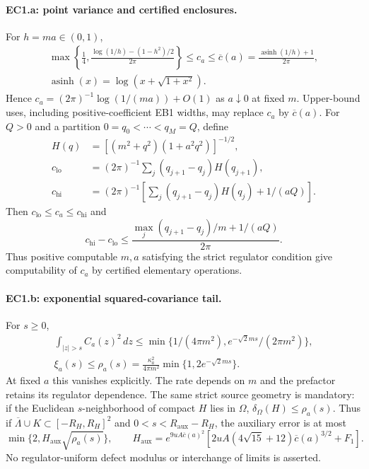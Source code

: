 \documentclass[11pt]{article}
\theoremstyle{plain}
\theoremstyle{definition}
\theoremstyle{remark}
\begin{document}
\paragraph{EC1.a: point variance and certified enclosures.}
For $h=ma\in(0,1)$,
\begin{gather*}
 \max\left\{\frac14,\frac{\log(1/h)-(1-h^2)/2}{2\pi}\right\}
 \le c_a\le\overline c(a)=\frac{\operatorname{asinh}(1/h)+1}{2\pi},\\
 \operatorname{asinh}(x)=\log(x+\sqrt{1+x^2}).
\end{gather*}
Hence $c_a=(2\pi)^{-1}\log(1/(ma))+O(1)$ as $a\downarrow0$ at fixed
$m$. Upper-bound uses, including positive-coefficient EB1 widths, may
replace $c_a$ by $\overline c(a)$. For $Q>0$ and a partition
$0=q_0<\cdots<q_M=Q$, define
\begin{align*}
 H(q)&=[(m^2+q^2)(1+a^2q^2)]^{-1/2},\\
 c_{\mathrm{lo}}&=(2\pi)^{-1}\sum_j(q_{j+1}-q_j)H(q_{j+1}),\\
 c_{\mathrm{hi}}&=(2\pi)^{-1}
 \left[\sum_j(q_{j+1}-q_j)H(q_j)+1/(aQ)\right].
\end{align*}
Then $c_{\mathrm{lo}}\le c_a\le c_{\mathrm{hi}}$ and
\[
 c_{\mathrm{hi}}-c_{\mathrm{lo}}
 \le\frac{\max_j(q_{j+1}-q_j)/m+1/(aQ)}{2\pi}.
\]
Thus positive computable $m,a$ satisfying the strict regulator condition
give computability of $c_a$ by certified elementary operations.

\paragraph{EC1.b: exponential squared-covariance tail.}
For $s\ge0$,
\begin{gather*}
 \int_{|z|>s}C_a(z)^2\,dz
 \le\min\{1/(4\pi m^2),e^{-\sqrt2ms}/(2\pi m^2)\},\\
 \xi_a(s)\le\rho_a(s)=\frac{\kappa_a^2}{4\pi m^2}
                         \min\{1,2e^{-\sqrt2ms}\}.
\end{gather*}
At fixed $a$ this vanishes explicitly. The rate depends on $m$ and the
prefactor retains its regulator dependence. The same strict source geometry
is mandatory: if the Euclidean $s$-neighborhood of compact $H$ lies in
$\Omega$, $\delta_\Omega(H)\le\rho_a(s)$. Thus if
$\overline\Lambda\cup K\subset[-R_H,R_H]^2$ and
$0<s<R_{\mathrm{aux}}-R_H$, the auxiliary error is at most
\[
 \min\{2,H_{\mathrm{aux}}\sqrt{\rho_a(s)}\},\qquad
 H_{\mathrm{aux}}=e^{9uA\overline c(a)^2}
 [2uA(4\sqrt{15}+12)\overline c(a)^{3/2}+F_1].
\]
No regulator-uniform defect modulus or interchange of limits is asserted.
\end{document}
